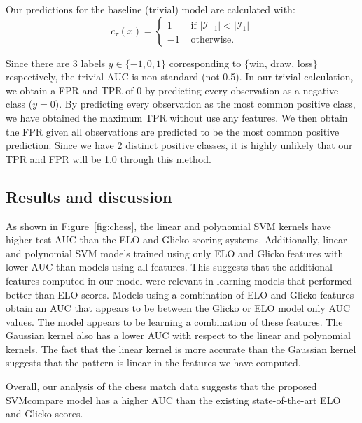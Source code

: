 \documentclass[twoside,11pt]{article}
\begin{document}
Our predictions for the baseline (trivial) model are calculated with:
\begin{equation}c_{\tau}(x)=
\begin{cases} 1 &
\text{ if } |
\mathcal I_{-1}|<|\mathcal I_1| \\ -1
& \text{ otherwise.} 

\end{cases}
\end{equation}

Since there are 3 labels $y\in\{-1,0,1\}$ corresponding to $\{$win, draw, loss$\}$ respectively, the trivial AUC is non-standard (not 0.5). In our trivial calculation, we obtain a FPR and TPR of 0 by predicting every observation as a negative class ($y=0$).  By predicting every observation as the most common positive class, we have obtained the maximum TPR without use any features.  We then obtain the FPR given all observations are predicted to be the most common positive prediction.  Since we have 2 distinct positive classes, it is highly unlikely that our TPR and FPR will be 1.0 through this method.

\subsection{Results and discussion}

As shown in Figure~\ref{fig:chess}, the linear and polynomial SVM kernels have
higher test AUC than the ELO and Glicko scoring systems.
Additionally, linear and polynomial SVM models trained using only ELO
and Glicko features with lower AUC than models using all features.  This suggests that the additional features computed in our model were
relevant in learning models that performed better than ELO scores.  Models using a combination of ELO and Glicko features obtain an AUC that appears to be between the Glicko or ELO model only AUC values.  The model appears to be learning a combination of these features.  The Gaussian kernel also has a lower AUC with respect to the linear and polynomial kernels.  The fact that the linear kernel is more accurate than the Gaussian kernel suggests that the pattern is linear in the features we have computed.

Overall, our analysis of the chess match data suggests that the
proposed SVMcompare model has a higher AUC than the existing
state-of-the-art ELO and Glicko scores.

\begin{figure*}[t]
	\centering
		
	\caption{Test AUC for each model used after training on the first 4 months of match data in the 8 different 12-month periods.  All SVM model AUCs are shown in addition to AUC of the ELO, Glicko scores and trivial model.  The plots in black show the trivial AUC calculated by predicting the most common positive label.  The plots in dark blue are AUC values obtained from using Glicko or ELO scores only.  The plots in light blue show the AUC distribution from models using only ELO and Glicko features and plots in white are AUC values from models using all computed features.}
	\label{fig:chess}
\end{figure*}
\end{document}

